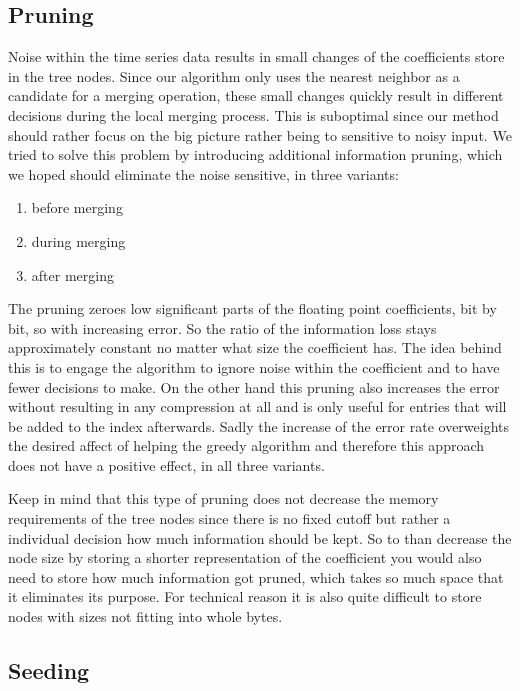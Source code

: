 \subsection{Pruning}
\label{ssec:algorithm:fail:pruning}

Noise within the time series data results in small changes of the coefficients store in the tree nodes. Since our algorithm only uses the nearest neighbor as a candidate for a merging operation, these small changes quickly result in different decisions during the local merging process. This is suboptimal since our method should rather focus on the big picture rather being to sensitive to noisy input. We tried to solve this problem by introducing additional information pruning, which we hoped should eliminate the noise sensitive, in three variants:

\begin{enumerate}
    \item before merging
    \item during merging
    \item after merging
\end{enumerate}

The pruning zeroes low significant parts of the floating point coefficients, bit by bit, so with increasing error. So the ratio of the information loss stays approximately constant no matter what size the coefficient has. The idea behind this is to engage the algorithm to ignore noise within the coefficient and to have fewer decisions to make. On the other hand this pruning also increases the error without resulting in any compression at all and is only useful for entries that will be added to the index afterwards. Sadly the increase of the error rate overweights the desired affect of helping the greedy algorithm and therefore this approach does not have a positive effect, in all three variants.

Keep in mind that this type of pruning does not decrease the memory requirements of the tree nodes since there is no fixed cutoff but rather a individual decision how much information should be kept. So to than decrease the node size by storing a shorter representation of the coefficient you would also need to store how much information got pruned, which takes so much space that it eliminates its purpose. For technical reason it is also quite difficult to store nodes with sizes not fitting into whole bytes.


\subsection{Seeding}
\label{ssec:algorithm:fail:seed}

